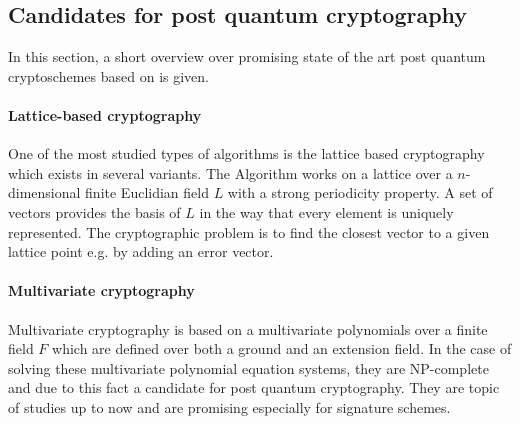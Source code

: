
\subsection*{Candidates for post quantum cryptography}
\label{pqalgcand}
In this section, a short overview over promising state of the art post quantum cryptoschemes based on \cite{bernstein2009introduction} is given. 
\paragraph*{Lattice-based cryptography}
One of the most studied types of algorithms is the lattice based cryptography which exists in several variants. The Algorithm works on a lattice over a $n$-dimensional finite Euclidian field $L$ with a strong periodicity property. A set of vectors provides the basis of $L$ in the way that every element is uniquely represented. The cryptographic problem is to find the closest vector to a given lattice point e.g. by adding an error vector\cite{bernstein2009introduction}\cite{micciancio2009lattice}.
\paragraph*{Multivariate cryptography}
Multivariate cryptography is based on a multivariate polynomials over a finite field $F$ which are defined over both a ground and an extension field. In the case of solving these multivariate polynomial equation systems, they are NP-complete and due to this fact a candidate for post quantum cryptography. They are topic of studies up to now and are promising especially for signature schemes\cite{bernstein2009introduction}\cite{wiki:multi}.

